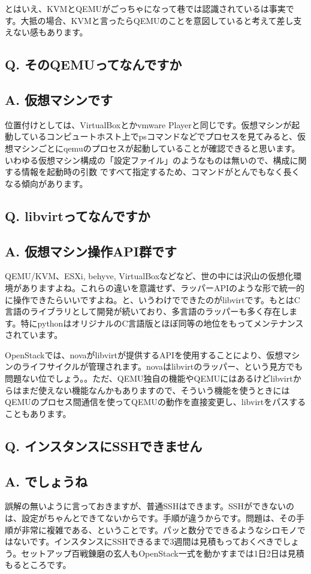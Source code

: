 \documentclass[9pt,b5paper,tombo,openany]{jsbook}
\begin{document}
とはいえ、KVMとQEMUがごっちゃになって巷では認識されているは事実です。大抵の場合、KVMと言ったらQEMUのことを意図していると考えて差し支えない感もあります。

\subsection*{{\LARGE\bfseries Q.} そのQEMUってなんですか}
\subsection*{{\LARGE\bfseries A.} 仮想マシンです}
位置付けとしては、VirtualBoxとかvmware Playerと同じです。仮想マシンが起動しているコンピュートホスト上でpsコマンドなどでプロセスを見てみると、仮想マシンごとにqemuのプロセスが起動していることが確認できると思います。いわゆる仮想マシン構成の「設定ファイル」のようなものは無いので、構成に関する情報を起動時の引数
ですべて指定するため、コマンドがとんでもなく長くなる傾向があります。

\subsection*{{\LARGE\bfseries Q.} libvirtってなんですか}
\subsection*{{\LARGE\bfseries A.} 仮想マシン操作API群です}
QEMU/KVM、ESXi, behyve, VirtualBoxなどなど、世の中には沢山の仮想化環境がありますよね。これらの違いを意識せず、ラッパーAPIのような形で統一的に操作できたらいいですよね。と、いうわけでできたのがlibvirtです。もとはC言語のライブラリとして開発が続いており、多言語のラッパーも多く存在します。特にpythonはオリジナルのC言語版とほぼ同等の地位をもってメンテナンスされています。

OpenStackでは、novaがlibvirtが提供するAPIを使用することにより、仮想マシンのライフサイクルが管理されます。novaはlibvirtのラッパー、という見方でも問題ない位でしょう。。ただ、QEMU独自の機能やQEMUにはあるけどlibvirtからはまだ使えない機能なんかもありますので、そういう機能を使うときにはQEMUのプロセス間通信を使ってQEMUの動作を直接変更し、libvirtをパスすることもあります。

\subsection*{{\LARGE\bfseries Q.} インスタンスにSSHできません}
\subsection*{{\LARGE\bfseries A.} でしょうね}
誤解の無いように言っておきますが、普通SSHはできます。SSHができないのは、設定がちゃんとできてないからです。手順が違うからです。問題は、その手順が非常に複雑である、ということです。パッと数分でできるようなシロモノではないです。インスタンスにSSHできるまで3週間は見積もっておくべきでしょう。セットアップ百戦錬磨の玄人もOpenStack一式を動かすまでは1日2日は見積もるところです。
\end{document}
